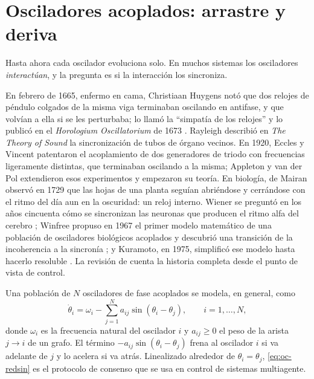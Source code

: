 \section{Osciladores acoplados: arrastre y deriva}
\label{sec:oc-acoplados}

Hasta ahora cada oscilador evoluciona solo. En muchos sistemas los osciladores \emph{interactúan}, y la pregunta es si la interacción los sincroniza.

\begin{historia}
En febrero de 1665, enfermo en cama, Christiaan Huygens notó que dos relojes de péndulo colgados de la misma viga terminaban oscilando en antifase, y que volvían a ella si se les perturbaba; lo llamó la ``simpatía de los relojes'' y lo publicó en el \emph{Horologium Oscillatorium} de 1673 \citep{Huy73}. Rayleigh describió en \emph{The Theory of Sound} la sincronización de tubos de órgano vecinos. En 1920, Eccles y Vincent patentaron el acoplamiento de dos generadores de triodo con frecuencias ligeramente distintas, que terminaban oscilando a la misma; Appleton y van der Pol extendieron esos experimentos y empezaron su teoría. En biología, de Mairan observó en 1729 que las hojas de una planta seguían abriéndose y cerrándose con el ritmo del día aun en la oscuridad: un reloj interno. Wiener se preguntó en los años cincuenta cómo se sincronizan las neuronas que producen el ritmo alfa del cerebro \citep{Wie58}; Winfree propuso en 1967 el primer modelo matemático de una población de osciladores biológicos acoplados y descubrió una transición de la incoherencia a la sincronía \citep{Win67}; y Kuramoto, en 1975, simplificó ese modelo hasta hacerlo resoluble \citep{Kur75,Kur84}. La revisión de \citet{DoBu14} cuenta la historia completa desde el punto de vista de control.
\end{historia}

Una población de $N$ osciladores de fase acoplados se modela, en general, como
\begin{equation}
  \dot\theta_i=\omega_i-\sum_{j=1}^Na_{ij}\sin(\theta_i-\theta_j),\qquad i=1,\dots,N,
  \label{eq:oc-redsin}
\end{equation}
donde $\omega_i$ es la frecuencia natural del oscilador $i$ y $a_{ij}\ge0$ el peso de la arista $j\to i$ de un grafo. El término $-a_{ij}\sin(\theta_i-\theta_j)$ frena al oscilador $i$ si va adelante de $j$ y lo acelera si va atrás. Linealizado alrededor de $\theta_i=\theta_j$, \eqref{eq:oc-redsin} es el protocolo de consenso que se usa en control de sistemas multiagente.

